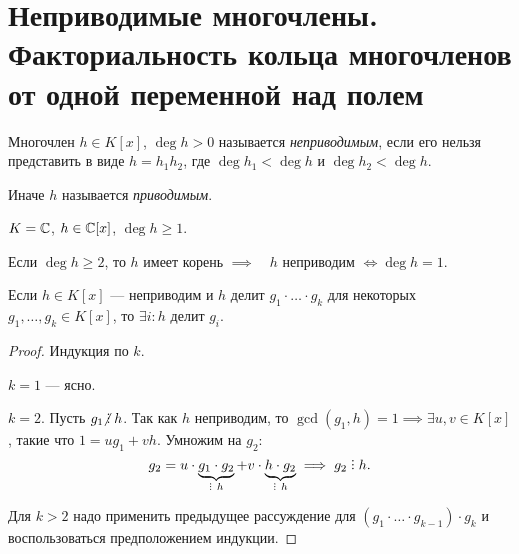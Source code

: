 \section{Неприводимые многочлены. Факториальность кольца многочленов от одной переменной над полем}

\begin{definition}
    Многочлен $h \in K[x]$, $\deg h > 0$ называется \textit{неприводимым}, если его нельзя представить в виде $h = h_1 h_2$, где $\deg h_1 < \deg h$ и $\deg h_2 < \deg h$.
\end{definition}

Иначе $h$ называется \textit{приводимым}.

\begin{comment}~
    \begin{enumerate}
        \item $h \in K[x]$, $\deg h = 1 \implies h $ неприводим;
        \item $h \in K[x]$, $\deg g \geq 2$, $h $ неприводим $ \implies h$ не имеет корней в $K$ (следствие теоремы Безу);
        \item $h \in K[x]$, $\deg h \in \{2, 3\} \implies \left[h \text{ неприводим } \iff h \text{ не имеет корней в $K$}\right]$.
    \end{enumerate}
\end{comment}

\begin{example}
    $K = \mathbb{C}$, $h \in \mathbb{C}[x]$, $\deg h \geq 1$.

    Если $\deg h \geq 2$, то $h$ имеет корень $ \implies \quad h$ неприводим $\iff \deg h = 1$. 
\end{example}

\begin{lemma}
    Если $h \in K[x]$ --- неприводим и $h$ делит $g_1 \cdot \ldots \cdot g_k$ для некоторых $g_1, \dots, g_k \in K[x]$, то $\exists i : h$ делит $g_i$.
\end{lemma}

\begin{proof}
    Индукция по $k$.

    $k = 1$ --- ясно.

    $k = 2$. Пусть $g_1 \!\!\not\;\divby h$. Так как $h$ неприводим, то $\gcd(g_1, h) = 1 \implies \exists u, v \in K[x]$, такие что $1 = ug_1 + vh$. Умножим на $g_2$:
    \begin{equation*}
        g_2 = u \cdot \underbrace{g_1 \cdot g_2}_{\divby \ h} + v \cdot \underbrace{h \cdot g_2}_{\divby \ h} \implies g_2 \divby h
    .\end{equation*}

    Для $k > 2$ надо применить предыдущее рассуждение для $(g_1 \cdot \ldots \cdot g_{k - 1}) \cdot g_k$ и воспользоваться предположением индукции.
\end{proof}

